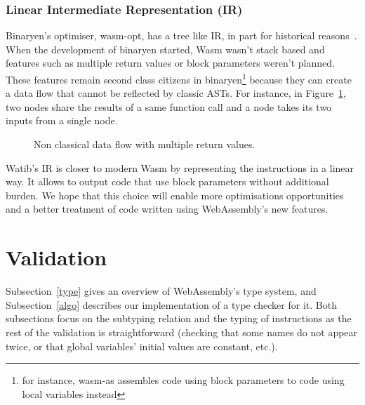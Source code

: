 \documentclass[a4paper,11pt]{article}
\begin{document}
\subsubsection{Linear Intermediate Representation (IR)}
Binaryen's optimiser, \textsf{wasm-opt}, has a tree like IR, in part for
historical reasons~\cite{BinaryenIR}. When the development of binaryen started,
Wasm wasn't stack based and features such as multiple return values or block
parameters weren't planned. These features remain second class citizens in
binaryen\footnote{for instance, \textsf{wasm-as} assembles code using block
parameters to code using local variables instead} because they can create a data
flow that cannot be reflected by classic ASTs. For instance, in
Figure~\ref{data-flow}, two nodes share the results of a same function call and
a node takes its two inputs from a single node.

\begin{figure}[h]
  \centering
  \caption{Non classical data flow with multiple return values.}\label{data-flow}
\end{figure}

\textsf{Watib}'s IR is closer to modern Wasm by representing the instructions in
a linear way. It allows to output code that use block parameters without
additional burden. We hope that this choice will enable more optimisations
opportunities and a better treatment of code written using WebAssembly's new
features.

\section{Validation}\label{val}
Subsection~\ref{type} gives an overview of WebAssembly's type system, and
Subsection~\ref{algo} describes our implementation of a type checker for it.
Both subsections focus on the subtyping relation and the typing of instructions
as the rest of the validation is straightforward (checking that some names do not
appear twice, or that global variables' initial values are constant, etc.).
\end{document}
